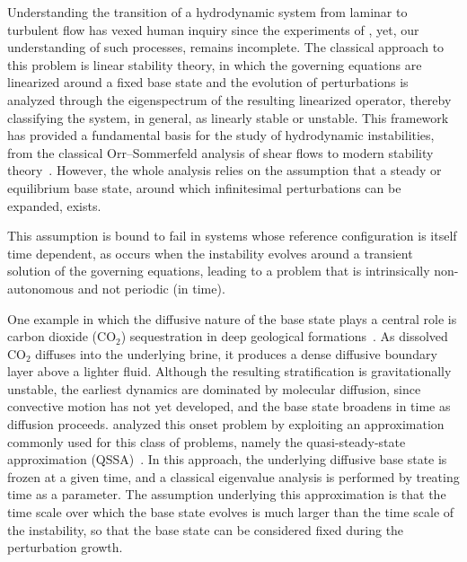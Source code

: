\clearpage
Understanding the transition of a hydrodynamic system from laminar to turbulent flow has vexed human inquiry since the experiments of \citet{reynolds-1883}, yet, our understanding of such processes, remains incomplete. The classical approach to this problem is linear stability theory, in which the governing equations are linearized around a fixed base state and the evolution of perturbations is analyzed through the eigenspectrum of the resulting linearized operator, thereby classifying the system, in general, as linearly stable or unstable. This framework has provided a fundamental basis for the study of hydrodynamic instabilities, from the classical Orr--Sommerfeld analysis of shear flows to modern stability theory~\citep{schmid-2007}. However, the whole analysis relies on the assumption that a steady or equilibrium base state, around which infinitesimal perturbations can be expanded, exists.

This assumption is bound to fail in systems whose reference configuration is itself time dependent, as occurs when the instability evolves around a transient solution of the governing equations, leading to a problem that is intrinsically non-autonomous and not periodic (in time).

One example in which the diffusive nature of the base state plays a central role is carbon dioxide (\(\mathrm{CO}_2\)) sequestration in deep geological formations~\citep{orr-2009}. As dissolved \(\mathrm{CO}_2\) diffuses into the underlying brine, it produces a dense diffusive boundary layer above a lighter fluid. Although the resulting stratification is gravitationally unstable, the earliest dynamics are dominated by molecular diffusion, since convective motion has not yet developed, and the base state broadens in time as diffusion proceeds. \citet{riaz-et-al-2006} analyzed this onset problem by exploiting an approximation commonly used for this class of problems, namely the quasi-steady-state approximation (QSSA)~\citep{tan-homsy-1986}. In this approach, the underlying diffusive base state is frozen at a given time, and a classical eigenvalue analysis is performed by treating time as a parameter. The assumption underlying this approximation is that the time scale over which the base state evolves is much larger than the time scale of the instability, so that the base state can be considered fixed during the perturbation growth.


